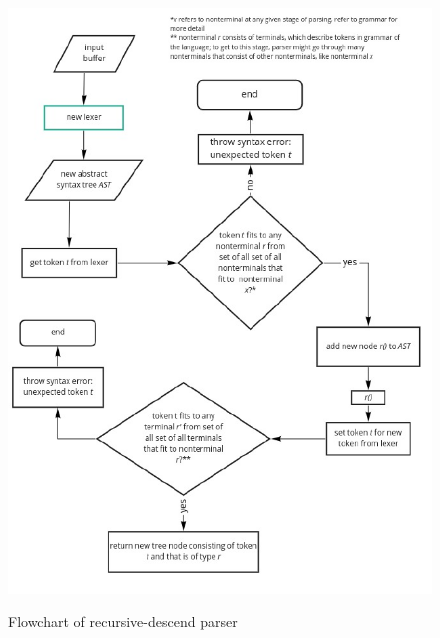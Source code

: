 \documentclass{article}
\begin{document}
    \begin{figure}[H]
        \centering
        \caption{Flowchart of recursive-descend parser}
        \includegraphics[width=\linewidth]{parser_flowchart}
        \label{fig:parser_flow}
    \end{figure}
\end{document}
